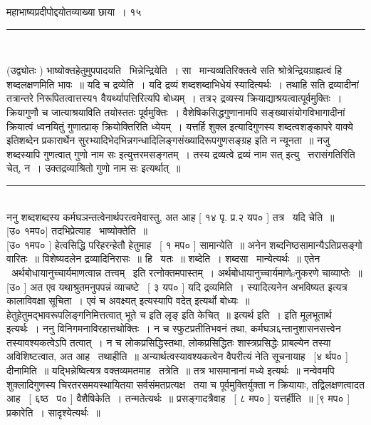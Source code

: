 \documentclass[11pt, openany]{book}
\begin{document}
\thispagestyle{empty}

\noindent 
\hspace{4cm} महाभाष्यप्रदीपोद्दयोतव्याख्या छाया~। \hspace{3cm} १५\\

\noindent
\rule{1\linewidth}{0.5pt}\\

\begin{multicols}{2}
(उद्व्योतः ) भाष्योक्तहेतुमुपपादयति \textendash\ भिन्नेन्द्रियेति~। सा \textendash\ मान्यव्यतिरिक्तत्वे सति श्रोत्रेन्द्रियग्राह्यत्वं हि शब्दलक्षणमिति भावः~॥ यदि च द्रव्येति~। यदि द्रव्यं शब्दशब्दाभिधेयं स्यादित्यर्थः~। तथाहि सति द्रव्यादीनां तत्रान्तरे निरूपितत्वात्तस्य१ वैयर्थ्यापत्तिरित्यपि बोध्यम्~। तत्र२ द्रव्यस्य क्रियाद्याश्रयत्वात्पूर्वमुक्तिः~। क्रियागुणौ च जात्याश्रयाविति तयोस्ततः पूर्वमुक्तिः~। वैशेषिकसिद्धगुणानामपि सङ्ख्यासंयोगविभागादीनां क्रियात्वं ध्वनयितुं गुणात्प्राक् क्रियोक्तिरिति ध्येयम्~। यत्तर्हि शुक्ल इत्यादिगुणस्य शब्दत्वशङ्कापरे वाक्ये {\qt इति}शब्देन प्रकारार्थेन सुरभ्यादिभेदभिन्नगन्धादिलिङ्गसंख्यादिरूपगुणसङ्ग्रह इति न न्यूनता~॥ नजु शब्दस्यापि गुणत्वात् {\qt गुणो नाम} सः इत्युत्तरमसङ्गतम्~। तस्य द्रव्यत्वे {\qt द्रव्यं नाम सत्} इत्यु \textendash\ त्तरासंगतिरिति चेत्, न~। {\qt उक्तद्रव्याश्रितो गुणो नाम सः} इत्यर्थात्~॥

\noindent
\rule{1\linewidth}{0.5pt}\\

ननु शब्दशब्दस्य कर्मघञन्तत्वेनार्थपरत्वमेवास्तु, अत आह [ १४ पृ. प्र.२ यप० ] तत्र \textendash\ यदि चेति~॥\\

[उ० १मप०] तदभिप्रेत्याह \textendash\ भाष्योक्तेति~॥\\

[उ० १मप० ] हेत्वसिद्धि परिहरन्हेतौ हेतुमाह \textendash\ [ १ मप० ] सामान्येति~॥ अनेन शब्दनिष्ठसामान्यैऽतिप्रसङ्गो वारितः~॥ विशेष्यदलेन द्रव्यादिनिरासः~॥ हि \textendash\ यतः~॥ शब्देति~। शब्दसा \textendash\ मान्येत्यर्थः~॥ एतेन \textendash\ अर्थबोधायानुच्चार्यमाणत्वान्न तत्त्वम् \textendash\ इति रत्नोक्तमपास्तम्~।  अर्थबोधायानुच्चार्यमाणेsनुकरणे चाव्याप्तेः~॥\\

[उ० ] अत एव यथाश्रुतमनुपपन्नं व्याचष्टे \textendash\ [ ३ यप० ] यदि द्रव्यमिति~। स्यादित्यनेन {\qt अभविष्यत} इत्यत्र कालाविवक्षा सूचिता~। एवं च {\qt अवक्ष्यत्} इत्यस्यापि {\qt वदेत्} इत्यर्थो बोध्यः~॥ हेतुहेतुमद्भावरूपलिङ्गनिमित्तत्वात् {\qt भूते च} इति लृङ् इति केचित्~॥ इत्यर्थ इति~। इति मूलभूतार्थ इत्यर्थः~। ननु विनिगमनाविरहात्तथोक्तिः~। न च स्फुटप्रतीतिभवनं तथा, कर्मघञ६न्तानुशासनसत्त्वेन तस्यावश्यकत्वेऽपि तत्वात्~। न च लोकप्रसिद्धिस्तथा, लोकप्रसिद्धितः शास्त्रप्रसिद्धेः प्राबल्येन तस्या अविशिष्टत्वात, अत आह \textendash\ तथाहीति~॥ अन्यार्थत्वस्यावश्यकत्वेन वैपरीत्यं नेति सूचनायाह \textendash\ [४ र्थप० ] दीनामिति~॥ यद्भिन्नेष्वित्यत्र वक्तव्यमतमाह \textendash\ तत्रेति~॥ तत्र भासमानानां मध्ये इत्यर्थः~॥ नन्वेवमपि शुक्लादिगुणस्य चिरतरसमयस्थायितया सर्वसंमतप्रत्यक्ष \textendash\ तया च पूर्वमुक्तिर्युक्ता न क्रियायाः, तद्विलक्षणत्वादत आह \textendash\ [ ६ष्ठ \textendash\ प० ] वैशैषिकेति~। तन्मतेत्यर्थः~॥ प्रसङ्गादत्रैवाह \textendash\ [ ८ मप० ] यत्तर्हीति~॥ [९ मप० ] प्रकारेति~।  सादृश्येत्यर्थः~॥


\end{multicols}
\end{document}

